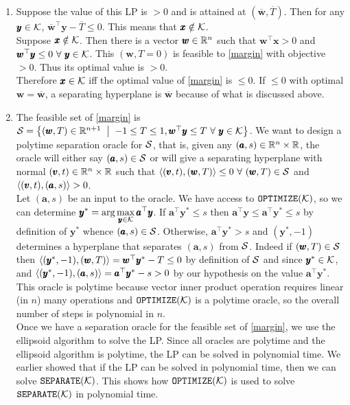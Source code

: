 \begin{enumerate}[label = (\alph*)]
\item Suppose the value of this LP is $>0$ and is attained at $(\overline {\pmb w},\overline T)$. Then for any $\pmb y\in{\mathcal{K}}$, $\overline {\pmb w}^{\top}\pmb y-\overline T \le 0$. This means that $\pmb x\notin {\mathcal{K}}$.\\
Suppose $\pmb x\notin {\mathcal{K}}$. Then there is a vector $\pmb w\in \mathbb{R}^{n}$ such that $\pmb w^{\top}\pmb x > 0$ and $\pmb w^{\top}\pmb y\le 0~\forall~ \pmb y\in {\mathcal{K}}$. This $(\pmb w,T=0)$ is feasible to \ref{margin} with objective $>0$. Thus its optimal value is $>0$.\\
Therefore $\pmb x\in {\mathcal{K}}$ iff the optimal value of \ref{margin} is $\le 0$. If $\le 0$ with optimal $\pmb w=\overline {\pmb w}$, a separating hyperplane is $\overline {\pmb w}$ because of what is discussed above.

\item The feasible set of \ref{margin} is $\cS = \set{(\pmb w,T)\in \R^{n+1}\st -1\le T\le 1, \pmb w^{\top}\pmb y\le T\fa \pmb y\in\cK}$. We want to design a polytime separation oracle for ${\mathcal{S}}$, that is, given any $(\pmb a,s)\in \mathbb{R}^{n}\times \mathbb{R}$, the oracle will either say $(\pmb a,s)\in {\mathcal{S}}$ or will give a separating hyperplane with normal $(\pmb v,t)\in\mathbb{R}^{n}\times \mathbb{R}$ such that $\left\langle (\pmb v,t), (\pmb w,T) \right\rangle\le 0~\forall~ (\pmb w,T)\in {\mathcal{S}}$ and $\left\langle (\pmb v,t), (\pmb a,s) \right\rangle> 0$.\\
Let $(\pmb a,s)$ be an input to the oracle. We have access to $\texttt{OPTIMIZE}({\mathcal{K}})$, so we can determine $\displaystyle\pmb y^{*}=\arg\max_{\pmb y\in {\mathcal{K}}} \pmb a^{\top}\pmb y$. If $\pmb a^{\top}\pmb y^{*} \le s$ then $\pmb a^{\top}\pmb y \le \pmb a^{\top}\pmb y^{*} \le s$ by definition of $\pmb y^{*}$ whence $(\pmb a,s)\in {\mathcal{S}}$. Otherwise, $\pmb a^{\top}\pmb y^{*} > s$ and $(\pmb y^{*},-1)$ determines a hyperplane that separates $(\pmb a,s)$ from ${\mathcal{S}}$. Indeed if $(\pmb w,T)\in {\mathcal{S}}$ then $\left\langle (\pmb y^{*},-1), (\pmb w,T) \right\rangle = \pmb w^{\top}\pmb y^{*} - T \le 0$ by definition of ${\mathcal{S}}$ and since $\pmb y^{*}\in {\mathcal{K}}$, and $\left\langle (\pmb y^{*},-1), (\pmb a,s) \right\rangle = \pmb a^{\top}\pmb y^{*} - s > 0$ by our hypothesis on the value $\pmb a^{\top}\pmb y^{*}$. This oracle is polytime because vector inner product operation requires linear (in $n$) many operations and $\texttt{OPTIMIZE}({\mathcal{K}})$ is a polytime oracle, so the overall number of steps is polynomial in $n$.\\
Once we have a separation oracle for the feasible set of \ref{margin}, we use the ellipsoid algorithm to solve the LP. Since all oracles are polytime and the ellipsoid algorithm is polytime, the LP can be solved in polynomial time. We earlier showed that if the LP can be solved in polynomial time, then we can solve $\texttt{SEPARATE}({\mathcal{K}})$. This shows how $\texttt{OPTIMIZE}({\mathcal{K}})$ is used to solve $\texttt{SEPARATE}({\mathcal{K}})$ in polynomial time.
\end{enumerate}














